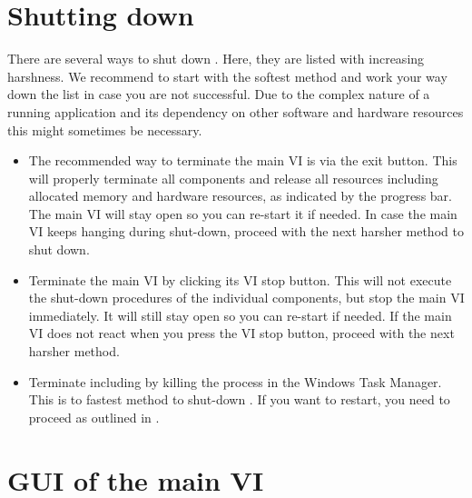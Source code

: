 \section{Shutting down \HS}\label{sec:using_shuttingDownHS}
There are several ways to shut down \HS. Here, they are listed with increasing harshness. We recommend to start with the softest method and work your way down the list in case you are not successful. Due to the complex nature of a running \HS application and its dependency on other software and hardware resources this might sometimes be necessary.
\begin{itemize}
	\item The recommended way to terminate the \HS main \ac{VI} is via the \HS exit button. This will properly terminate all components and release all resources including allocated memory and hardware resources, as indicated by the progress bar. The main \ac{VI} will stay open so you can re-start it if needed. In case the main \ac{VI} keeps hanging during shut-down, proceed with the next harsher method to shut down.
	\item Terminate the \HS main \ac{VI} by clicking its \ac{VI} stop button. This will not execute the shut-down procedures of the individual components, but stop the main \ac{VI} immediately. It will still stay open so you can re-start if needed. If the main \ac{VI} does not react when you press the \ac{VI} stop button, proceed with the next harsher method.
	\item Terminate \LV including \HS by killing the \LV process in the Windows Task Manager. This is to fastest method to shut-down \HS. If you want to restart, you need to proceed as outlined in .
\end{itemize}

\section{\ac{GUI} of the \HS main \ac{VI}}\label{sec:using_mainVIGUI}


